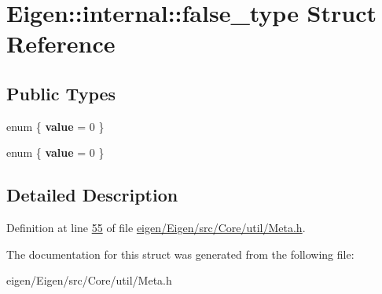 \hypertarget{struct_eigen_1_1internal_1_1false__type}{}\section{Eigen\+:\+:internal\+:\+:false\+\_\+type Struct Reference}
\label{struct_eigen_1_1internal_1_1false__type}
\subsection*{Public Types}
\begin{DoxyCompactItemize}
\item 
\mbox{\label{struct_eigen_1_1internal_1_1false__type_a645c32d0e7bad1917794025db0208cca}} 
enum \{ {\bfseries value} = 0
 \}
\item 
\mbox{\label{struct_eigen_1_1internal_1_1false__type_a1545b83add6d1aa7606e62e8758a40de}} 
enum \{ {\bfseries value} = 0
 \}
\end{DoxyCompactItemize}


\subsection{Detailed Description}


Definition at line \hyperlink{eigen_2_eigen_2src_2_core_2util_2_meta_8h_source_l00055}{55} of file \hyperlink{eigen_2_eigen_2src_2_core_2util_2_meta_8h_source}{eigen/\+Eigen/src/\+Core/util/\+Meta.\+h}.



The documentation for this struct was generated from the following file\+:\begin{DoxyCompactItemize}
\item 
eigen/\+Eigen/src/\+Core/util/\+Meta.\+h\end{DoxyCompactItemize}
